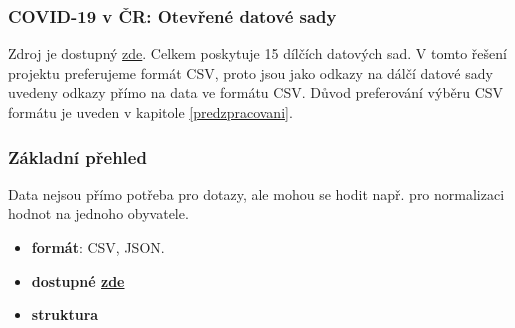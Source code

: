 \documentclass[12pt]{article}
\begin{document}
\subsubsection{COVID-19 v ČR: Otevřené datové sady}
\label{data1}
Zdroj je dostupný \href{https://onemocneni-aktualne.mzcr.cz/api/v2/covid-19}{zde}. Celkem poskytuje 15 dílčích datových sad. V tomto řešení projektu preferujeme formát CSV, proto jsou jako odkazy na dálčí datové sady uvedeny odkazy přímo na data ve formátu CSV. Důvod preferování výběru CSV formátu je uveden v kapitole \ref{predzpracovani}.

\subsubsection*{Základní přehled}
Data nejsou přímo potřeba pro dotazy, ale mohou se hodit např. pro normalizaci hodnot na jednoho obyvatele.
\begin{itemize}
    \item \textbf{formát}: CSV, JSON.
    \item \textbf{dostupné  \href{https://onemocneni-aktualne.mzcr.cz/api/v2/covid-19/osoby.csv}{zde}}
    \item \textbf{struktura}
\end{itemize}
\end{document}
